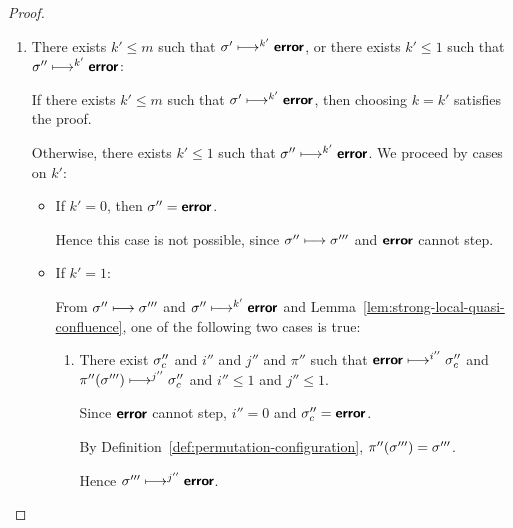\begin{proof}
\begin{enumerate}
\begin{itemize}
\begin{enumerate}
          Hence $\conf' \ctxstepsto^{i'+1} \error$.

          Since $i' \leq m$, we have that $i' + 1 \leq m + 1$, and
          so choosing $k = i' + 1$ satisfies the proof.
            
        \end{enumerate}

      \end{itemize}

    \item There exists $k' \leq m$ such that $\sigma' \longmapsto^{k'}
      \textbf{\textsf{error}}$, or there exists $k' \leq 1$ such that $\sigma''
      \longmapsto^{k'} \textbf{\textsf{error}}$:

      If there exists $k' \leq m$ such that $\sigma' \longmapsto^{k'}
      \textbf{\textsf{error}}$, then choosing $k = k'$ satisfies the proof.

      Otherwise, there exists $k' \leq 1$ such that $\sigma''
      \longmapsto^{k'} \textbf{\textsf{error}}$.  We proceed by cases on $k'$:

      \begin{itemize}

      \item If $k' = 0$, then $\sigma'' = \textbf{\textsf{error}}$.

        Hence this case is not possible, since $\sigma'' \longmapsto
        \sigma'''$ and $\textbf{\textsf{error}}$ cannot step.

      \item If $k' = 1$:

        From $\sigma'' \longmapsto \sigma'''$ and $\sigma''
        \longmapsto^{k'} \textbf{\textsf{error}}$ and
        Lemma~\ref{lem:strong-local-quasi-confluence}, one of the
        following two cases is true:

        \begin{enumerate}
        \item There exist $\sigma_c''$ and $i''$ and $j''$ and $\pi''$
          such that $\textbf{\textsf{error}} \longmapsto^{i''} \sigma_c''$ and
          $\pi''(\sigma''') \longmapsto^{j''} \sigma_c''$ and $i'' \leq
          1$ and $j'' \leq 1$.

          Since $\textbf{\textsf{error}}$ cannot step, $i'' = 0$ and $\sigma''_c =
          \textbf{\textsf{error}}$.

          By Definition~\ref{def:permutation-configuration},
          $\pi''(\sigma''') = \sigma'''$.

          Hence $\sigma''' \longmapsto^{j''} \textbf{\textsf{error}}$.



\end{enumerate}
\end{itemize}
\end{enumerate}
\end{proof}

